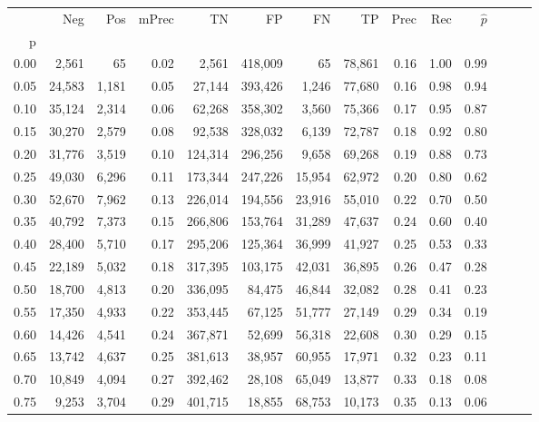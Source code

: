 \begin{tabular}{rrrrrrrrrrrrrr}
\toprule
{} &     Neg &    Pos & mPrec &       TN &       FP &      FN &      TP &  Prec &   Rec & $\hat{p}$ \\
p    &         &        &       &          &          &         &         &       &       &           \\
\midrule
0.00 &   2,561 &     65 &  0.02 &    2,561 &  418,009 &      65 &  78,861 &  0.16 &  1.00 &      0.99 \\
0.05 &  24,583 &  1,181 &  0.05 &   27,144 &  393,426 &   1,246 &  77,680 &  0.16 &  0.98 &      0.94 \\
0.10 &  35,124 &  2,314 &  0.06 &   62,268 &  358,302 &   3,560 &  75,366 &  0.17 &  0.95 &      0.87 \\
0.15 &  30,270 &  2,579 &  0.08 &   92,538 &  328,032 &   6,139 &  72,787 &  0.18 &  0.92 &      0.80 \\
0.20 &  31,776 &  3,519 &  0.10 &  124,314 &  296,256 &   9,658 &  69,268 &  0.19 &  0.88 &      0.73 \\
0.25 &  49,030 &  6,296 &  0.11 &  173,344 &  247,226 &  15,954 &  62,972 &  0.20 &  0.80 &      0.62 \\
0.30 &  52,670 &  7,962 &  0.13 &  226,014 &  194,556 &  23,916 &  55,010 &  0.22 &  0.70 &      0.50 \\
0.35 &  40,792 &  7,373 &  0.15 &  266,806 &  153,764 &  31,289 &  47,637 &  0.24 &  0.60 &      0.40 \\
0.40 &  28,400 &  5,710 &  0.17 &  295,206 &  125,364 &  36,999 &  41,927 &  0.25 &  0.53 &      0.33 \\
0.45 &  22,189 &  5,032 &  0.18 &  317,395 &  103,175 &  42,031 &  36,895 &  0.26 &  0.47 &      0.28 \\
0.50 &  18,700 &  4,813 &  0.20 &  336,095 &   84,475 &  46,844 &  32,082 &  0.28 &  0.41 &      0.23 \\
0.55 &  17,350 &  4,933 &  0.22 &  353,445 &   67,125 &  51,777 &  27,149 &  0.29 &  0.34 &      0.19 \\
0.60 &  14,426 &  4,541 &  0.24 &  367,871 &   52,699 &  56,318 &  22,608 &  0.30 &  0.29 &      0.15 \\
0.65 &  13,742 &  4,637 &  0.25 &  381,613 &   38,957 &  60,955 &  17,971 &  0.32 &  0.23 &      0.11 \\
0.70 &  10,849 &  4,094 &  0.27 &  392,462 &   28,108 &  65,049 &  13,877 &  0.33 &  0.18 &      0.08 \\
0.75 &   9,253 &  3,704 &  0.29 &  401,715 &   18,855 &  68,753 &  10,173 &  0.35 &  0.13 &      0.06 \\

\end{tabular}
